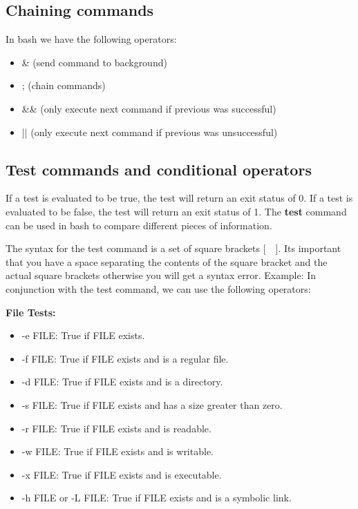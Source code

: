 \documentclass{report}
\begin{document}
    \subsection{Chaining commands} 
    \bigbreak \noindent 
    In bash we have the following operators:
    \begin{itemize}
        \item \& (send command to background)
        \item ; (chain commands)
        \item \&\& (only execute next command if previous was successful)
        \item || (only execute next command if previous was unsuccessful)
    \end{itemize}

    \bigbreak \noindent 
    \subsection{Test commands and conditional operators}
    \bigbreak \noindent 
    \begin{concept}
       If a test is evaluated to be true, the test will return an exit status of 0. If a test is evaluated to be false, the test will return an exit status of 1. The \textbf{test} command can be used in bash to compare different pieces of information.
    \end{concept}
    \bigbreak \noindent 
    The syntax for the test command is a set of square brackets [\ \ ]. Its important that you have a space separating the contents of the square bracket and the actual square brackets otherwise you will get a syntax error.
    \bigbreak \noindent 
    \bigbreak \noindent 
    Example:
    \bigbreak \noindent 
    In conjunction with the test command, we can use the following operators:
    \bigbreak \noindent 
    \begin{minipage}[t]{0.47\textwidth}
        \textbf{File Tests:}
        \begin{itemize}
            \item -e FILE: True if FILE exists.
            \item -f FILE: True if FILE exists and is a regular file.
            \item -d FILE: True if FILE exists and is a directory.
            \item -s FILE: True if FILE exists and has a size greater than zero.
            \item -r FILE: True if FILE exists and is readable.
            \item -w FILE: True if FILE exists and is writable.
            \item -x FILE: True if FILE exists and is executable.
            \item -h FILE or -L FILE: True if FILE exists and is a symbolic link.
        \end{itemize}
    \end{minipage}
\end{document}
